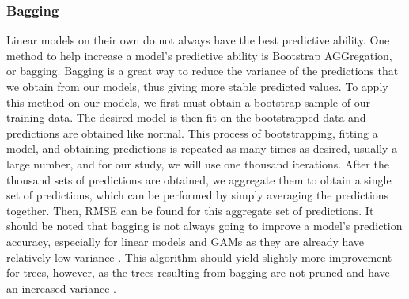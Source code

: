 \documentclass[12pt]{article}\usepackage[]{graphicx}\usepackage[]{color}
\begin{document}
\subsubsection{Bagging}
Linear models on their own do not always have the best predictive ability. One method to help increase a model's predictive ability is Bootstrap AGGregation, or bagging. Bagging is a great way to reduce the variance of the predictions that we obtain from our models, thus giving more stable predicted values. To apply this method on our models, we first must obtain a bootstrap sample of our training data. The desired model is then fit on the bootstrapped data and predictions are obtained like normal. This process of bootstrapping, fitting a model, and obtaining predictions is repeated as many times as desired, usually a large number, and for our study, we will use one thousand iterations. After the thousand sets of predictions are obtained, we aggregate them to obtain a single set of predictions, which can be performed by simply averaging the predictions together. Then, RMSE can be found for this aggregate set of predictions. It should be noted that bagging is not always going to improve a model's prediction accuracy, especially for linear models and GAMs as they are already have relatively low variance \cite{bag}. This algorithm should yield slightly more improvement for trees, however, as the trees resulting from bagging are not pruned and have an increased variance \cite{gam}.
\end{document}
